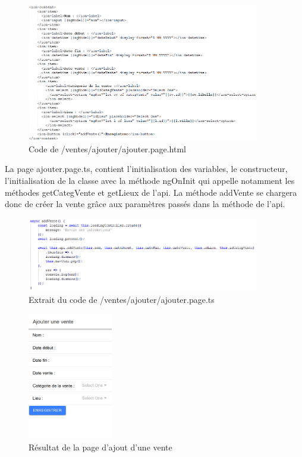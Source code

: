 			\begin{figure}[H]
				\centering\includegraphics[width=0.9\textwidth, keepaspectratio]{res/ajouter.png}
				\caption{Code de /ventes/ajouter/ajouter.page.html}
			\end{figure}

			La page ajouter.page.ts, contient l'initialisation des variables, le constructeur, l'initialisation de la classe avec la méthode ngOnInit qui appelle notamment les méthodes getCategVente et getLieux de l'api.\newline
			La méthode addVente se chargera donc de créer la vente grâce aux paramètres passés dans la méthode de l'api.

			\begin{figure}[H]
				\centering\includegraphics[width=0.9\textwidth, keepaspectratio]{res/ajouterTs.png}
				\caption{Extrait du code de /ventes/ajouter/ajouter.page.ts}
			\end{figure}

			\begin{figure}[H]
				\centering\includegraphics[width=0.33\textwidth, keepaspectratio]{res/ajouterVente.png}
				\caption{Résultat de la page d'ajout d'une vente}
			\end{figure}

